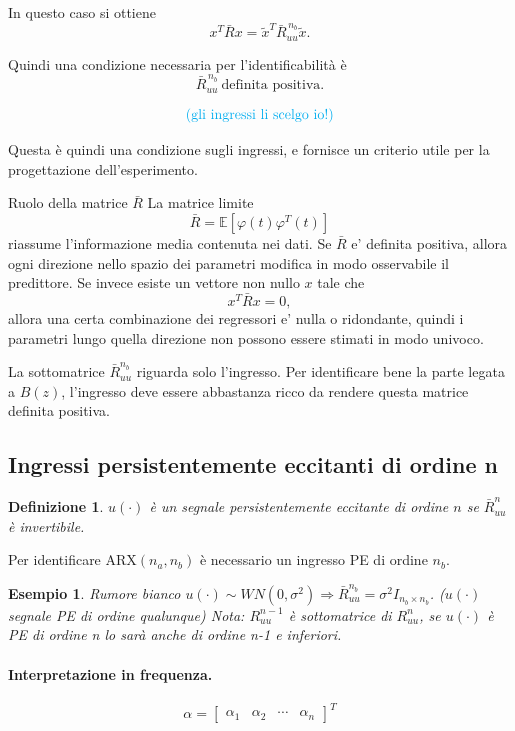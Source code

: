 \documentclass[11pt,a4paper]{article}
\newtheorem{definition}{Definizione}
\newtheorem{example}{Esempio}
\begin{document}
In questo caso si ottiene
\[
x^{T}\bar R x
=
\tilde x^{T}\bar R_{uu}^{\,n_b}\tilde x.
\]

Quindi una condizione necessaria per l'identificabilità è
\[
\boxed{\bar R_{uu}^{\,n_b}\ \text{definita positiva}}.
\]

\[
\textcolor{cyan}{\text{(gli ingressi li scelgo io!)}}
\]

Questa è quindi una condizione sugli ingressi, e fornisce un criterio utile per la progettazione dell'esperimento.

\begin{spiegazione}{Ruolo della matrice $\bar R$}
La matrice limite
\[
\bar R=\mathbb E[\varphi(t)\varphi^T(t)]
\]
riassume l'informazione media contenuta nei dati. Se $\bar R$ e' definita positiva, allora ogni direzione nello spazio dei parametri modifica in modo osservabile il predittore. Se invece esiste un vettore non nullo $x$ tale che
\[
x^T\bar R x=0,
\]
allora una certa combinazione dei regressori e' nulla o ridondante, quindi i parametri lungo quella direzione non possono essere stimati in modo univoco.

La sottomatrice $\bar R_{uu}^{n_b}$ riguarda solo l'ingresso. Per identificare bene la parte legata a $B(z)$, l'ingresso deve essere abbastanza ricco da rendere questa matrice definita positiva.
\end{spiegazione}

\subsection{Ingressi persistentemente eccitanti di ordine n}
\begin{definition}
$u(\cdot)$ è un segnale persistentemente eccitante di ordine $n$ se $\bar R_{uu}^{n}$ è invertibile.
\end{definition}
Per identificare ARX$(n_a,n_b)$ è necessario un ingresso PE di ordine $n_b$.
\begin{example}
Rumore bianco $u(\cdot)\sim WN(0,\sigma^2)\Rightarrow \bar R_{uu}^{n_b}=\sigma^2I_{n_b \times n_b}$. ($u(\cdot)$ segnale PE di ordine qualunque)
Nota: $R_{uu}^{n-1}$ è sottomatrice di $R_{uu}^{n}$, se $u(\cdot)$ è PE di ordine n lo sarà anche di ordine n-1 e inferiori.
\end{example}
\paragraph{Interpretazione in frequenza.}
\[
\alpha=
\begin{bmatrix}
\alpha_1 & \alpha_2 & \cdots & \alpha_n
\end{bmatrix}^{T}
\]
\end{document}
